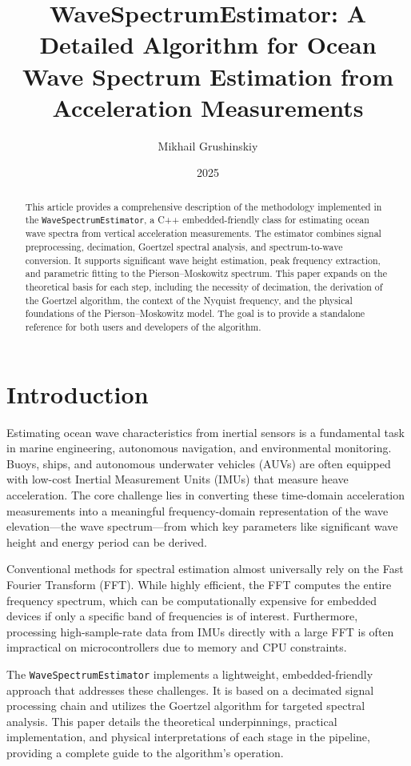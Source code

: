 \documentclass[11pt,letterpaper]{article}
\title{WaveSpectrumEstimator: A Detailed Algorithm for Ocean Wave Spectrum Estimation from Acceleration Measurements}
\author{Mikhail Grushinskiy}
\date{2025}
\begin{document}
    \maketitle

    \begin{abstract}
        This article provides a comprehensive description of the methodology implemented in the \texttt{WaveSpectrumEstimator}, a C++ embedded-friendly class for estimating ocean wave spectra from vertical acceleration measurements. The estimator combines signal preprocessing, decimation, Goertzel spectral analysis, and spectrum-to-wave conversion. It supports significant wave height estimation, peak frequency extraction, and parametric fitting to the Pierson--Moskowitz spectrum. This paper expands on the theoretical basis for each step, including the necessity of decimation, the derivation of the Goertzel algorithm, the context of the Nyquist frequency, and the physical foundations of the Pierson--Moskowitz model. The goal is to provide a standalone reference for both users and developers of the algorithm.
    \end{abstract}

    \tableofcontents

    \section{Introduction}
    \label{sec:intro}
    Estimating ocean wave characteristics from inertial sensors is a fundamental task in marine engineering, autonomous navigation, and environmental monitoring. Buoys, ships, and autonomous underwater vehicles (AUVs) are often equipped with low-cost Inertial Measurement Units (IMUs) that measure heave acceleration. The core challenge lies in converting these time-domain acceleration measurements into a meaningful frequency-domain representation of the wave elevation—the wave spectrum—from which key parameters like significant wave height and energy period can be derived.

    Conventional methods for spectral estimation almost universally rely on the Fast Fourier Transform (FFT). While highly efficient, the FFT computes the entire frequency spectrum, which can be computationally expensive for embedded devices if only a specific band of frequencies is of interest. Furthermore, processing high-sample-rate data from IMUs directly with a large FFT is often impractical on microcontrollers due to memory and CPU constraints.

    The \texttt{WaveSpectrumEstimator} implements a lightweight, embedded-friendly approach that addresses these challenges. It is based on a decimated signal processing chain and utilizes the Goertzel algorithm for targeted spectral analysis. This paper details the theoretical underpinnings, practical implementation, and physical interpretations of each stage in the pipeline, providing a complete guide to the algorithm's operation.
\end{document}
